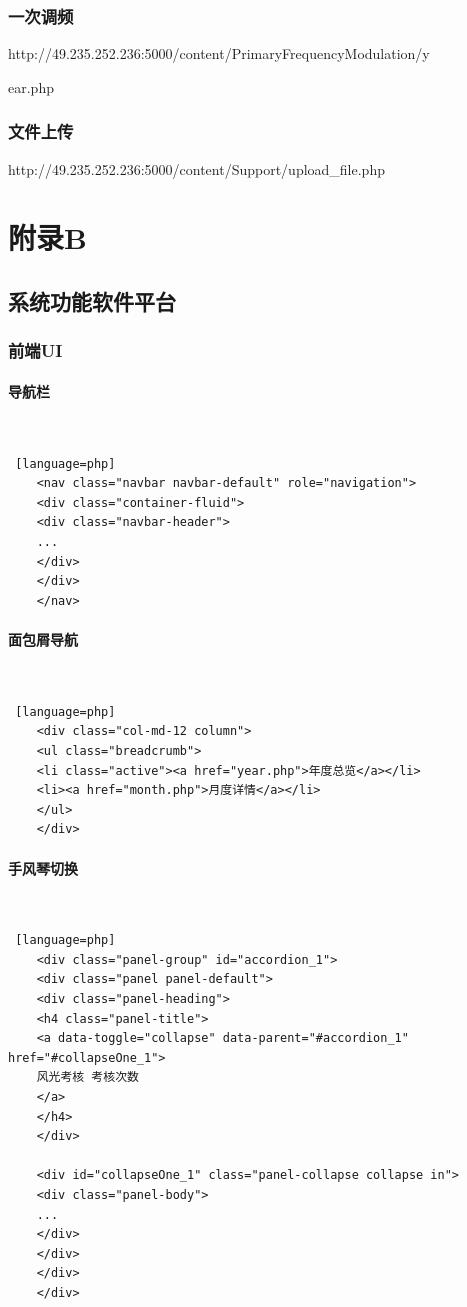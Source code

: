\documentclass[winfonts,UTF8,a4paper]{ctexart}
\begin{document}
\subsubsection*{一次调频}

http://49.235.252.236:5000/content/PrimaryFrequencyModulation/y

ear.php

\subsubsection*{文件上传}

http://49.235.252.236:5000/content/Support/upload\_file.php

\newpage
\section*{附录B}
\subsection*{系统功能软件平台}
\subsubsection*{前端UI}
\paragraph*{导航栏}\ \\
\begin{lstlisting} [language=php]
	<nav class="navbar navbar-default" role="navigation">
	<div class="container-fluid">
	<div class="navbar-header">
	...
	</div>
	</div>
	</nav>
\end{lstlisting}
\paragraph*{面包屑导航}\ \\
\begin{lstlisting} [language=php]
	<div class="col-md-12 column">
	<ul class="breadcrumb"> 
	<li class="active"><a href="year.php">年度总览</a></li>
	<li><a href="month.php">月度详情</a></li>
	</ul>
	</div>
\end{lstlisting}
\paragraph*{手风琴切换}\ \\
\begin{lstlisting} [language=php]
	<div class="panel-group" id="accordion_1">
	<div class="panel panel-default">
	<div class="panel-heading">
	<h4 class="panel-title">
	<a data-toggle="collapse" data-parent="#accordion_1" href="#collapseOne_1">
	风光考核 考核次数
	</a>
	</h4>
	</div>
	
	<div id="collapseOne_1" class="panel-collapse collapse in">
	<div class="panel-body">
	...
	</div>
	</div>
	</div>
	</div>
\end{lstlisting}
\end{document}
